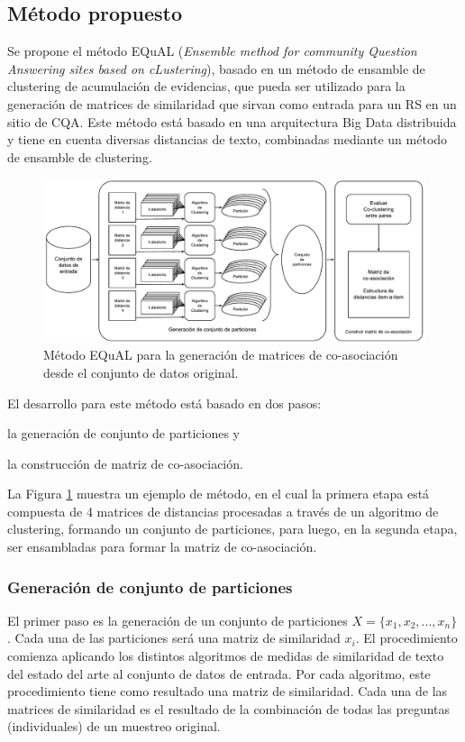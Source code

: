 \subsection{Método propuesto}
Se propone el método EQuAL (\textit{Ensemble method for community Question Answering sites based on cLustering}), basado en un método de ensamble de clustering de acumulación de evidencias, que pueda ser utilizado para la generación de matrices de similaridad que sirvan como entrada para un RS en un sitio de CQA. Este método está basado en una arquitectura Big Data distribuida y tiene en cuenta diversas distancias de texto, combinadas mediante un método de ensamble de clustering.

\begin{figure}[h!]
	\centering
	\includegraphics[width=0.9\linewidth]{8_problema_investigacion/imagenes/metodo_equal}
	\caption{Método EQuAL para la generación de matrices de co-asociación desde el conjunto de datos original.}
	\label{fig:metodoequal}
\end{figure}

El desarrollo para este método está basado en dos pasos: \begin{enumerate*} [label=(\roman*)] \item la generación de conjunto de particiones y \item la construcción de matriz de co-asociación. \end{enumerate*} La Figura \ref{fig:metodoequal} muestra un ejemplo de método, en el cual la primera etapa está compuesta de 4 matrices de distancias procesadas a través de un algoritmo de clustering, formando un conjunto de particiones, para luego, en la segunda etapa, ser ensambladas para formar la matriz de co-asociación.


\subsubsection{Generación de conjunto de particiones}
El primer paso es la generación de un conjunto de particiones \(X = \{x_1, x_2,... , x_n\}\) . Cada una de las particiones será una matriz de similaridad \(x_i\). El procedimiento comienza aplicando los distintos algoritmos de medidas de similaridad de texto del estado del arte al conjunto de datos de entrada. Por cada algoritmo, este procedimiento tiene como resultado una matriz de similaridad. Cada una de las matrices de similaridad es el resultado de la combinación de todas las preguntas (individuales) de un muestreo original.


